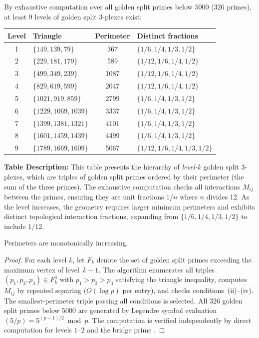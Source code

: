 \begin{theorem}
\label{thm:hierarchy}
By exhaustive computation over all golden split primes below $5000$
($326$ primes), at least $9$ levels of golden split $3$-plexes exist:

\begin{center}
\begin{tabular}{@{}clcl@{}}
\toprule
Level & Triangle & Perimeter & Distinct fractions \\
\midrule
1 & $\{149, 139, 79\}$   & 367  & $\{1/6,1/4,1/3,1/2\}$ \\
2 & $\{229, 181, 179\}$   & 589  & $\{1/12,1/6,1/4,1/2\}$ \\
3 & $\{499, 349, 239\}$   & 1087 & $\{1/12,1/6,1/4,1/2\}$ \\
4 & $\{829, 619, 599\}$   & 2047 & $\{1/12,1/6,1/4,1/2\}$ \\
5 & $\{1021, 919, 859\}$  & 2799 & $\{1/6,1/4,1/3,1/2\}$ \\
6 & $\{1229, 1069, 1039\}$ & 3337 & $\{1/6,1/4,1/3,1/2\}$ \\
7 & $\{1399, 1381, 1321\}$ & 4101 & $\{1/6,1/4,1/3,1/2\}$ \\
8 & $\{1601, 1459, 1439\}$ & 4499 & $\{1/6,1/4,1/3,1/2\}$ \\
9 & $\{1789, 1669, 1609\}$ & 5067 & $\{1/12,1/6,1/4,1/3,1/2\}$ \\
\bottomrule
\end{tabular}
\end{center}
\textbf{Table Description:} This table presents the hierarchy of \emph{level-$k$} golden split $3$-plexes, which are triples of golden split primes ordered by their perimeter (the sum of the three primes). The exhaustive computation checks all interactions $M_{ij}$ between the primes, ensuring they are unit fractions $1/n$ where $n$ divides 12. As the level increases, the geometry requires larger minimum perimeters and exhibits distinct topological interaction fractions, expanding from $\{1/6, 1/4, 1/3, 1/2\}$ to include $1/12$.

Perimeters are monotonically increasing.
\end{theorem}

\begin{proof}
For each level $k$, let $F_k$ denote the set of golden split primes
exceeding the maximum vertex of level~$k-1$. The algorithm enumerates
all triples $(p_1, p_2, p_3) \in F_k^3$ with $p_1 > p_2 > p_3$
satisfying the triangle inequality, computes $M_{ij}$ by repeated
squaring ($O(\log p)$ per entry), and checks conditions~(ii)--(iv).
The smallest-perimeter triple passing all conditions is selected.
All $326$ golden split primes below $5000$ are generated by Legendre
symbol evaluation $(5/p) = 5^{(p-1)/2} \bmod p$. The computation is
verified independently by direct computation for levels $1$--$2$ and the bridge
prime \cite{lockwood_larue_dwm}. \qedhere
\end{proof}

